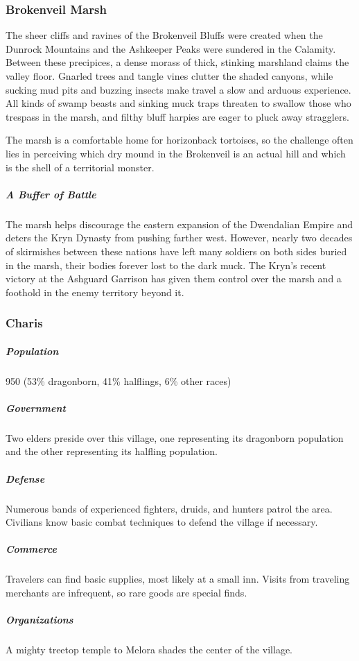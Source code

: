 \documentclass[10pt,a4paper,twoside,bg=print,twocolumn,openany,nodeprecatedcode]{dndbook}
\begin{document}
\subsubsection{Brokenveil Marsh}
The sheer cliffs and ravines of the Brokenveil Bluffs were created when the Dunrock Mountains and the Ashkeeper Peaks were sundered in the Calamity. Between these precipices, a dense morass of thick, stinking marshland claims the valley floor. Gnarled trees and tangle vines clutter the shaded canyons, while sucking mud pits and buzzing insects make travel a slow and arduous experience. All kinds of swamp beasts and sinking muck traps threaten to swallow those who trespass in the marsh, and filthy bluff harpies are eager to pluck away stragglers.

The marsh is a comfortable home for horizonback tortoises, so the challenge often lies in perceiving which dry mound in the Brokenveil is an actual hill and which is the shell of a territorial monster.

\subparagraph{A Buffer of Battle}
The marsh helps discourage the eastern expansion of the Dwendalian Empire and deters the Kryn Dynasty from pushing farther west. However, nearly two decades of skirmishes between these nations have left many soldiers on both sides buried in the marsh, their bodies forever lost to the dark muck. The Kryn's recent victory at the Ashguard Garrison has given them control over the marsh and a foothold in the enemy territory beyond it.

\subsubsection{Charis}
\subparagraph{Population}
950 (53\% dragonborn, 41\% halflings, 6\% other races)

\subparagraph{Government}
Two elders preside over this village, one representing its dragonborn population and the other representing its halfling population.

\subparagraph{Defense}
Numerous bands of experienced fighters, druids, and hunters patrol the area. Civilians know basic combat techniques to defend the village if necessary.

\subparagraph{Commerce}
Travelers can find basic supplies, most likely at a small inn. Visits from traveling merchants are infrequent, so rare goods are special finds.

\subparagraph{Organizations}
A mighty treetop temple to Melora shades the center of the village.
\end{document}
